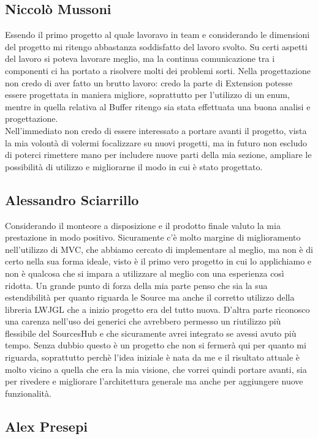 \documentclass[a4paper,12pt]{report}
\begin{document}
\subsection*{Niccolò Mussoni}
Essendo il primo progetto al quale lavoravo in team e considerando le dimensioni del progetto mi ritengo abbastanza soddisfatto del lavoro svolto. Su certi aspetti del lavoro si poteva lavorare meglio, ma la continua comunicazione tra i componenti ci ha portato a risolvere molti dei problemi sorti. Nella progettazione non credo di aver fatto un brutto lavoro: credo la parte di Extension potesse essere progettata in maniera migliore, soprattutto per l'utilizzo di un enum, mentre in quella relativa al Buffer ritengo sia stata effettuata una buona analisi e progettazione. 
\\Nell'immediato non credo di essere interessato a portare avanti il progetto, vista la mia volontà di volermi focalizzare su nuovi progetti, ma in futuro non escludo di poterci rimettere mano per includere nuove parti della mia sezione, ampliare le possibilità di utilizzo e migliorarne il modo in cui è stato progettato.
\subsection*{Alessandro Sciarrillo}
Considerando il monteore a disposizione e il prodotto finale valuto la mia prestazione in modo positivo.
Sicuramente c'è molto margine di miglioramento nell'utilizzo di MVC, che abbiamo cercato di implementare al meglio, ma non è di certo nella sua forma ideale, visto è il primo vero progetto in cui lo applichiamo e non è qualcosa che si impara a utilizzare al meglio con una esperienza così ridotta. Un grande punto di forza della mia parte penso che sia la sua estendibilità per quanto riguarda le Source ma anche il corretto utilizzo della libreria LWJGL che a inizio progetto era del tutto nuova. D'altra parte riconosco una carenza nell'uso dei generici che avrebbero permesso un riutilizzo più flessibile del SourcesHub e che sicuramente avrei integrato se avessi avuto più tempo.
Senza dubbio questo è un progetto che non si fermerà qui per quanto mi riguarda, soprattutto perchè l'idea iniziale è nata da me e il risultato attuale è molto vicino a quella che era la mia visione, che vorrei quindi portare avanti, sia per rivedere e migliorare l'architettura generale ma anche per aggiungere nuove funzionalità.
\subsection*{Alex Presepi}
\end{document}
